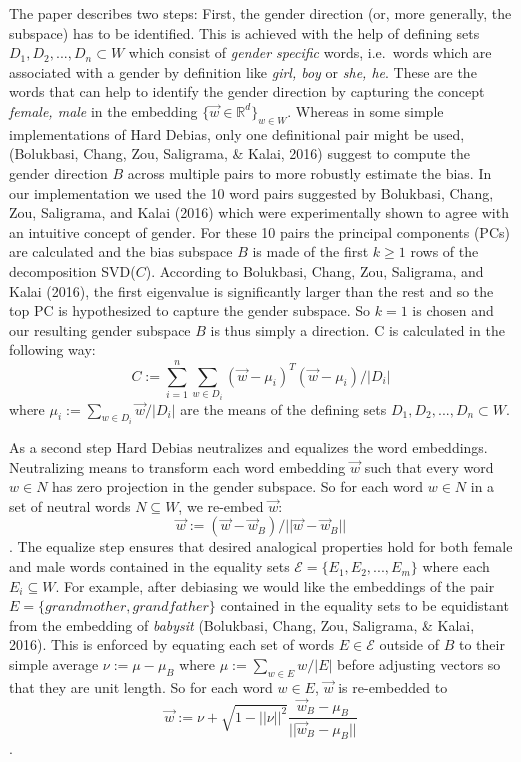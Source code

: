 \documentclass[
  english,
  man,floatsintext]{apa6}
\begin{document}
The paper describes two steps: First, the gender direction (or, more generally, the subspace) has to be identified. This is achieved with the help of defining sets \(D_1, D_2, ..., D_n \subset W\) which consist of \emph{gender specific} words, i.e.~words which are associated with a gender by definition like \emph{girl, boy} or \emph{she, he}. These are the words that can help to identify the gender direction by capturing the concept \emph{female, male} in the embedding \(\{\vec{w}\in\mathbb{R}^d\}_{w\in W}\). Whereas in some simple implementations of Hard Debias, only one definitional pair might be used, (Bolukbasi, Chang, Zou, Saligrama, \& Kalai, 2016) suggest to compute the gender direction \(B\) across multiple pairs to more robustly estimate the bias. In our implementation we used the 10 word pairs suggested by Bolukbasi, Chang, Zou, Saligrama, and Kalai (2016) which were experimentally shown to agree with an intuitive concept of gender. For these 10 pairs the principal components (PCs) are calculated and the bias subspace \(B\) is made of the first \(k \geq 1\) rows of the decomposition SVD(\(C\)). According to Bolukbasi, Chang, Zou, Saligrama, and Kalai (2016), the first eigenvalue is significantly larger than the rest and so the top PC is hypothesized to capture the gender subspace. So \(k=1\) is chosen and our resulting gender subspace \(B\) is thus simply a direction. C is calculated in the following way: \[C:=\sum_{i=1}^n \sum_{w\in D_i}(\vec{w}-\mu_i)^T(\vec{w}-\mu_i)/|D_i|\] where \(\mu_i := \sum_{w\in D_i}\vec{w}/|D_i|\) are the means of the defining sets \(D_1, D_2, ..., D_n \subset W\).

As a second step Hard Debias neutralizes and equalizes the word embeddings. Neutralizing means to transform each word embedding \(\vec{w}\) such that every word \(w\in N\) has zero projection in the gender subspace. So for each word \(w\in N\) in a set of neutral words \(N \subseteq W\), we re-embed \(\vec{w}\): \[\vec{w}:=(\vec{w}-\vec{w}_B)/||\vec{w}-\vec{w}_B||\]. The equalize step ensures that desired analogical properties hold for both female and male words contained in the equality sets \(\mathcal{E}=\{E_1,E_2,...,E_m\}\) where each \(E_i \subseteq W\). For example, after debiasing we would like the embeddings of the pair \(E=\{grandmother, grandfather\}\) contained in the equality sets to be equidistant from the embedding of \emph{babysit} (Bolukbasi, Chang, Zou, Saligrama, \& Kalai, 2016). This is enforced by equating each set of words \(E\in \mathcal{E}\) outside of \(B\) to their simple average \(\nu:=\mu-\mu_B\) where \(\mu:=\sum_{w\in E}w/|E|\) before adjusting vectors so that they are unit length. So for each word \(w\in E\), \(\vec{w}\) is re-embedded to \[\vec{w}:=\nu+\sqrt{1-||\nu||^2}\frac{\vec{w}_B-\mu_B}{||\vec{w}_B-\mu_B||}\].
\end{document}
